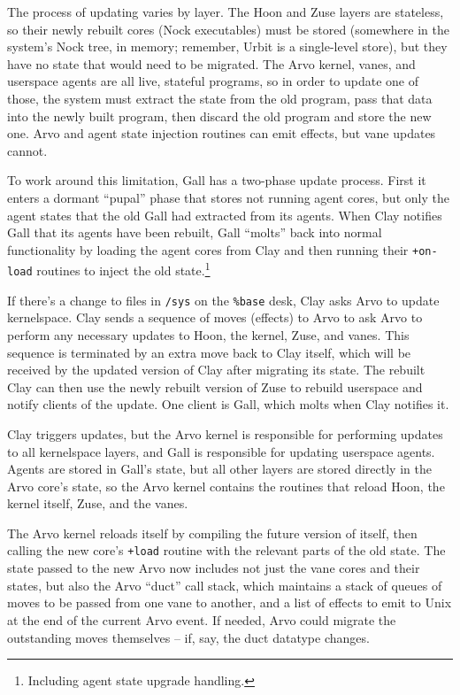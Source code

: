 \documentclass[twoside]{article}
\begin{document}
The process of updating varies by layer. The Hoon and Zuse layers are stateless, so their newly rebuilt cores (Nock executables) must be stored (somewhere in the system’s Nock tree, in memory; remember, Urbit is a single-level store), but they have no state that would need to be migrated. The Arvo kernel, vanes, and userspace agents are all live, stateful programs, so in order to update one of those, the system must extract the state from the old program, pass that data into the newly built program, then discard the old program and store the new one. Arvo and agent state injection routines can emit effects, but vane updates cannot.

To work around this limitation, Gall has a two-phase update process. First it enters a dormant ``pupal'' phase that stores not running agent cores, but only the agent states that the old Gall had extracted from its agents. When Clay notifies Gall that its agents have been rebuilt, Gall ``molts'' back into normal functionality by loading the agent cores from Clay and then running their \lstinline[style=inlinecode]{+on-load} routines to inject the old state.\footnote{Including agent state upgrade handling.}

If there's a change to files in \lstinline[style=inlinecode]{/sys} on the \lstinline[style=inlinecode]{%base} desk, Clay asks Arvo to update kernelspace. Clay sends a sequence of moves (effects) to Arvo to ask Arvo to perform any necessary updates to Hoon, the kernel, Zuse, and vanes. This sequence is terminated by an extra move back to Clay itself, which will be received by the updated version of Clay after migrating its state. The rebuilt Clay can then use the newly rebuilt version of Zuse to rebuild userspace and notify clients of the update. One client is Gall, which molts when Clay notifies it.

Clay triggers updates, but the Arvo kernel is responsible for performing updates to all kernelspace layers, and Gall is responsible for updating userspace agents. Agents are stored in Gall's state, but all other layers are stored directly in the Arvo core's state, so the Arvo kernel contains the routines that reload Hoon, the kernel itself, Zuse, and the vanes.

The Arvo kernel reloads itself by compiling the future version of itself, then calling the new core's \lstinline[style=inlinecode]{+load} routine with the relevant parts of the old state. The state passed to the new Arvo now includes not just the vane cores and their states, but also the Arvo ``duct'' call stack, which maintains a stack of queues of moves to be passed from one vane to another, and a list of effects to emit to Unix at the end of the current Arvo event. If needed, Arvo could migrate the outstanding moves themselves – if, say, the duct datatype changes.
\end{document}
